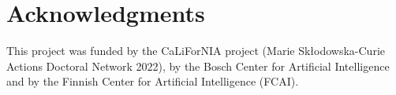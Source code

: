 \section{Acknowledgments}\label{sec:acknowledgments}
This project was funded by the CaLiForNIA project (Marie Skłodowska-Curie Actions Doctoral Network 2022), by the Bosch Center for Artificial Intelligence and by the Finnish Center for Artificial Intelligence (FCAI).